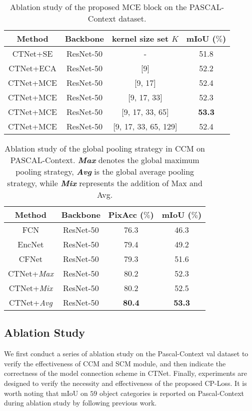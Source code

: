 \documentclass[10pt,journal,cspaper,compsoc]{IEEEtran}
\begin{document}
\begin{table}[t]
\centering
\caption{Ablation study of the proposed MCE block on the PASCAL-Context dataset.}
\label{table1}
\renewcommand\arraystretch{1.3}
\begin{tabular}{c|c|c||c}
			\hline
			Method & Backbone & kernel size set $K$ & mIoU ($\%$)  \\
			\hline
			CTNet+SE \cite{hu2018squeeze} & ResNet-50 & - & 51.8 \\
			
			CTNet+ECA \cite{wang2020eca} & ResNet-50 & [9] & 52.2 \\
			\hline
			CTNet+MCE & ResNet-50 & [9, 17] & 52.4 \\
			
			CTNet+MCE & ResNet-50 & [9, 17, 33] & 52.3 \\
			
			CTNet+MCE & ResNet-50 & [9, 17, 33, 65] & \textbf{53.3} \\
			
			CTNet+MCE & ResNet-50 & [9, 17, 33, 65, 129] & 52.4 \\
\hline
\end{tabular}
\end{table}
	
	
\begin{table}[t]
\centering
\caption{Ablation study of the global pooling strategy in CCM on PASCAL-Context. \textbf{\textit{Max}} denotes the global maximum pooling strategy, \textbf{\textit{Avg}} is the global average pooling strategy, while \textbf{\textit{Mix}} represents the addition of Max and Avg.}
\label{table2}
		\renewcommand\arraystretch{1.3}
		\centering
		\begin{tabular}{c|c||c||c}
			\hline
			Method &Backbone &PixAcc ($\%$) &mIoU ($\%$)\\
			\hline
			FCN \cite{shelhamer2017fully}  &   ResNet-50&   76.3 &46.3\\
			EncNet \cite{zhang2018context} &ResNet-50 & 79.4& 49.2\\
			CFNet \cite{zhang2019co}& ResNet-50& 79.3& 51.6\\
			\hline
			CTNet+\textit{Max} & ResNet-50& 80.2& 52.3\\
			CTNet+\textit{Mix} & ResNet-50& 80.2& 52.5\\
			CTNet+\textit{Avg} & ResNet-50& \textbf{80.4}& \textbf{53.3}\\
			\hline
	\end{tabular}
\end{table}
\subsection{Ablation Study}
We first conduct a series of ablation study on the Pascal-Context val dataset to verify the effectiveness of CCM and SCM module, and then indicate the correctness of the model connection scheme in CTNet. Finally, experiments are designed to verify the necessity and effectiveness of the proposed CP-Loss. It is worth noting that mIoU on $59$ object categories is reported on Pascal-Context during ablation study by following previous work.
	
\end{document}
